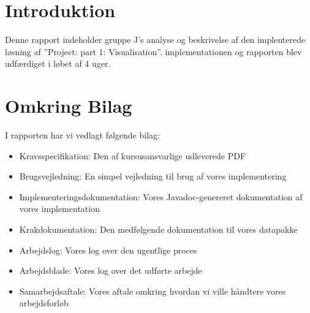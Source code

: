 \section{Introduktion}
Denne rapport indeholder gruppe J's analyse og beskrivelse af den implenterede løsning af ''Project: part 1: Visualisation''. implementationen og rapporten blev udfærdiget i løbet af 4 uger.
\section{Omkring Bilag}
I rapporten har vi vedlagt følgende bilag:
\begin{itemize}
\item{Kravsspecifikation: Den af kursusansvarlige udleverede PDF}
\item{Brugsvejledning: En simpel vejledning til brug af vores implementering}
\item{Implementeringsdokumentation: Vores Javadoc-genereret dokumentation af vores implementation}
\item{Krakdokumentation: Den medfølgende dokumentation til vores datapakke}
\item{Arbejdslog: Vores log over den ugentlige proces}
\item{Arbejdsblade: Vores log over det udførte arbejde}
\item{Samarbejdsaftale: Vores aftale omkring hvordan vi ville håndtere vores arbejdsforløb}
\end{itemize}

